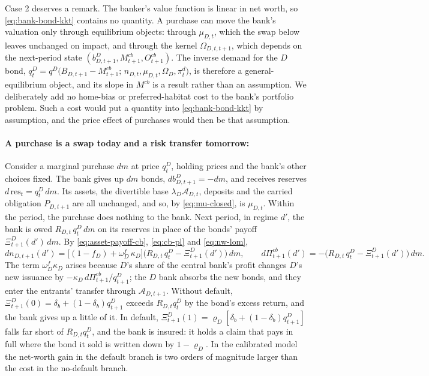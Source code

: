 Case 2 deserves a remark. The banker's value function is linear in net worth, so
\eqref{eq:bank-bond-kkt} contains no quantity. A purchase can move the bank's
valuation only through equilibrium objects: through $\mu_{D,t}$, which the swap
below leaves unchanged on impact, and through the kernel $\Omega_{D,t,t+1}$,
which depends on the next-period state
$(b^{D}_{D,t+1},M^{cb}_{t+1},O^{cb}_{t+1})$. The inverse demand for the $D$
bond,
$q^{D}_t=q^{D}\bigl(B_{D,t+1}-M^{cb}_{t+1};\,n_{D,t},\mu_{D,t},\Omega_{D},\pi^{d}_t\bigr)$,
is therefore a general-equilibrium object, and its slope in $M^{cb}$ is a result
rather than an assumption. We deliberately add no home-bias or preferred-habitat
cost to the bank's portfolio problem. Such a cost would put a quantity into
\eqref{eq:bank-bond-kkt} by assumption, and the price effect of purchases would
then be that assumption.

\paragraph{A purchase is a swap today and a risk transfer tomorrow:}
Consider a marginal purchase $dm$ at price $q^{D}_t$, holding prices and the
bank's other choices fixed. The bank gives up $dm$ bonds,
$db^{D}_{D,t+1}=-dm$, and receives reserves $d\,\mathrm{res}_t=q^{D}_t\,dm$. Its
assets, the divertible base $\lambda_D\mathcal{A}_{D,t}$, deposits and the carried
obligation $P_{D,t+1}$ are all unchanged, and so, by \eqref{eq:mu-closed}, is
$\mu_{D,t}$. Within the period, the purchase does nothing to the bank. Next
period, in regime $d'$, the bank is owed $R_{D,t}\,q^{D}_t\,dm$ on its reserves in
place of the bonds' payoff $\Xi^{D}_{t+1}(d')\,dm$. By \eqref{eq:asset-payoff-cb},
\eqref{eq:cb-pl} and \eqref{eq:nw-lom},
\begin{equation}
dn_{D,t+1}(d')=\bigl[(1-f_D)+\omega^{f}_{D}\,\kappa_D\bigr]
\bigl(R_{D,t}\,q^{D}_t-\Xi^{D}_{t+1}(d')\bigr)\,dm,
\qquad
d\Pi^{cb}_{t+1}(d')=-\bigl(R_{D,t}\,q^{D}_t-\Xi^{D}_{t+1}(d')\bigr)\,dm .
\label{eq:risk-transfer}
\end{equation}
The term $\omega^{f}_{D}\kappa_D$ arises because $D$'s share of the central bank's
profit changes $D$'s new issuance by $-\kappa_D\,d\Pi^{cb}_{t+1}/q^{D}_{t+1}$; the
$D$ bank absorbs the new bonds, and they enter the entrants' transfer through
$\mathcal{A}_{D,t+1}$. Without default,
$\Xi^{D}_{t+1}(0)=\delta_b+(1-\delta_b)q^{D}_{t+1}$ exceeds $R_{D,t}q^{D}_t$ by
the bond's excess return, and the bank gives up a little of it. In default,
$\Xi^{D}_{t+1}(1)=\varrho_D[\delta_b+(1-\delta_b)q^{D}_{t+1}]$ falls far short
of $R_{D,t}q^{D}_t$, and the bank is insured: it holds a claim that pays in full
where the bond it sold is written down by $1-\varrho_D$. In the calibrated model
the net-worth gain in the default branch is two orders of magnitude larger than
the cost in the no-default branch.

